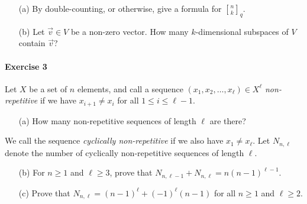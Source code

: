 \documentclass[a4paper,12pt]{article}
\newcommand{\qbinom}{\genfrac{[}{]}{0pt}{}}
\begin{document}
\begin{itemize}
	\item[(a)] By double-counting, or otherwise, give a formula for $\qbinom{n}{k}_q$.
	\item[(b)] Let $\vec{v} \in V$ be a non-zero vector. How many $k$-dimensional subspaces of $V$ contain $\vec{v}$?
\end{itemize}

\paragraph{Exercise 3}  Let $X$ be a set of $n$ elements, and call a sequence $(x_1, x_2, \hdots, x_\ell) \in X^{\ell}$ \emph{non-repetitive} if we have $x_{i+1} \neq x_i$ for all $1 \le i \le \ell-1$.

\begin{itemize}
	\item[(a)] How many non-repetitive sequences of length $\ell$ are there?
\end{itemize}

We call the sequence \emph{cyclically non-repetitive} if we also have $x_1 \neq x_{\ell}$. Let $N_{n,\ell}$ denote the number of cyclically non-repetitive sequences of length $\ell$.

\begin{itemize}
	\item[(b)] For $n \ge 1$ and $\ell \ge 3$, prove that $N_{n,\ell-1} + N_{n, \ell} = n(n-1)^{\ell-1}$.
	\item[(c)] Prove that $N_{n, \ell} = (n-1)^{\ell} + (-1)^{\ell}(n-1)$ for all $n \ge 1$ and $\ell \ge 2$.
\end{itemize}
\end{document}
